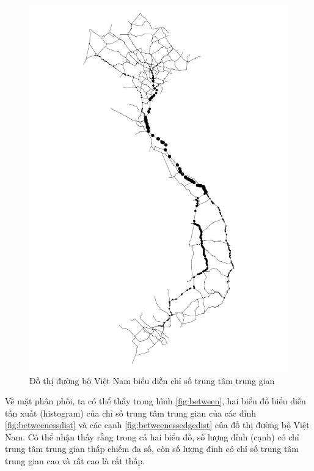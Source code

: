 \documentclass[14pt, oneside, a4paper, openany]{scrartcl}
\begin{document}
\begin{figure}[!h]
	\centering
	\includegraphics[scale=0.5]{figures/vietnamroadbetweeness.pdf} 
	\caption[Đồ thị đường bộ Việt Nam biểu diễn chỉ số trung tâm trung gian]{Đồ thị đường bộ Việt Nam biểu diễn chỉ số trung tâm trung gian}
	\label{fig:betweeness}
\end{figure}

Về mặt phân phối, ta có thể thấy trong hình \ref{fig:between}, hai biểu đồ biểu diễn tần xuất (histogram) của chỉ số trung tâm trung gian của các đỉnh \ref{fig:betweenessdist} và các cạnh \ref{fig:betweenessedgedist} của đồ thị đường bộ Việt Nam. Có thể nhận thấy rằng trong cả hai biểu đồ, số lượng đỉnh (cạnh) có chỉ trung tâm trung gian thấp chiếm đa số, còn số lượng đỉnh có chỉ số trung tâm trung gian cao và rất cao là rất thấp.
\end{document}
